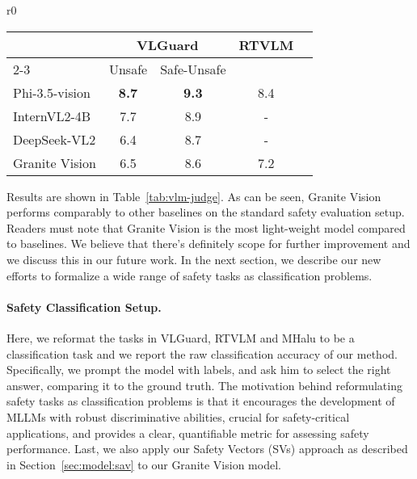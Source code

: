 \begin{wraptable}{r}{0\textwidth}
    \begin{tabular}{lcccc}
    \toprule
    & \multicolumn{2}{c}{VLGuard} & RTVLM & \\
    \cmidrule(lr){2-3}
    & Unsafe & Safe-Unsafe \\
    \midrule
    Phi-3.5-vision   & \textbf{8.7} & \textbf{9.3} & 8.4 \\
    InternVL2-4B & 7.7 & 8.9  & - \\
    DeepSeek-VL2  & 6.4 & 8.7 & - \\
    Granite Vision  & 6.5 & 8.6 & 7.2 \\
    \bottomrule
    \end{tabular}
    \caption{\textbf{Results} for \textit{VLM-as-a-Judge} setup.}
    \label{tab:vlm-judge}
    \vspace{-15pt}
\end{wraptable}

Results are shown in Table~\ref{tab:vlm-judge}. As can be seen, Granite Vision performs comparably to other baselines on the standard safety evaluation setup. Readers must note that Granite Vision is the most light-weight model compared to baselines. We believe that there's definitely scope for further improvement and we discuss this in our future work. 
In the next section, we describe our new efforts to formalize a wide range of safety tasks as classification problems.

\paragraph{Safety Classification Setup.} Here, we reformat the tasks in VLGuard, RTVLM and MHalu to be a classification task and we report the raw classification accuracy of our method. Specifically, we prompt the model with labels, and ask him to select the right answer, comparing it to the ground truth. The motivation behind reformulating safety tasks as classification problems is that it encourages the development of MLLMs with robust discriminative abilities, crucial for safety-critical applications, and provides a clear, quantifiable metric for assessing safety performance. Last, we also apply our Safety Vectors (SVs) approach as described in Section~\ref{sec:model:sav} to our Granite Vision model.


